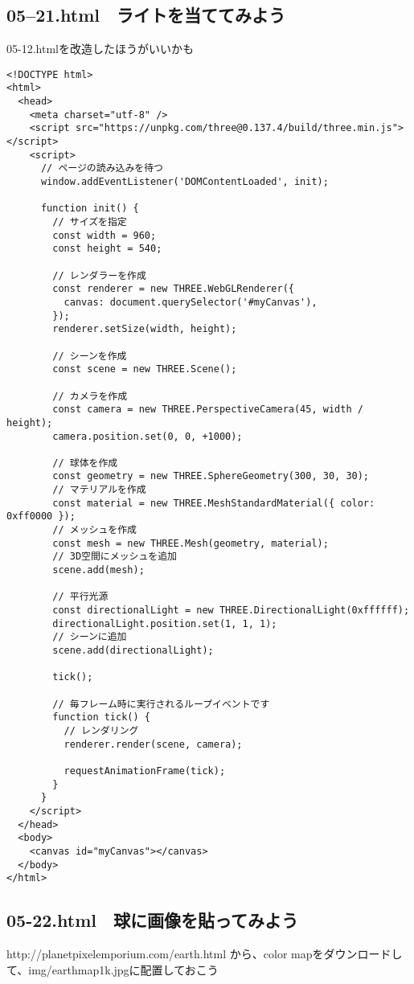 \documentclass[mingoth,11pt,a4j,uplatex]{jsarticle}
\begin{document}
\subsection{05--21.html　ライトを当ててみよう}
05-12.htmlを改造したほうがいいかも
\begin{lstlisting}[caption=05-21.html]
<!DOCTYPE html>
<html>
  <head>
    <meta charset="utf-8" />
    <script src="https://unpkg.com/three@0.137.4/build/three.min.js"></script>
    <script>
      // ページの読み込みを待つ
      window.addEventListener('DOMContentLoaded', init);

      function init() {
        // サイズを指定
        const width = 960;
        const height = 540;

        // レンダラーを作成
        const renderer = new THREE.WebGLRenderer({
          canvas: document.querySelector('#myCanvas'),
        });
        renderer.setSize(width, height);

        // シーンを作成
        const scene = new THREE.Scene();

        // カメラを作成
        const camera = new THREE.PerspectiveCamera(45, width / height);
        camera.position.set(0, 0, +1000);

        // 球体を作成
        const geometry = new THREE.SphereGeometry(300, 30, 30);
        // マテリアルを作成
        const material = new THREE.MeshStandardMaterial({ color: 0xff0000 });
        // メッシュを作成
        const mesh = new THREE.Mesh(geometry, material);
        // 3D空間にメッシュを追加
        scene.add(mesh);

        // 平行光源
        const directionalLight = new THREE.DirectionalLight(0xffffff);
        directionalLight.position.set(1, 1, 1);
        // シーンに追加
        scene.add(directionalLight);

        tick();

        // 毎フレーム時に実行されるループイベントです
        function tick() {
          // レンダリング
          renderer.render(scene, camera);

          requestAnimationFrame(tick);
        }
      }
    </script>
  </head>
  <body>
    <canvas id="myCanvas"></canvas>
  </body>
</html>
\end{lstlisting}

\subsection{05-22.html　球に画像を貼ってみよう}
http://planetpixelemporium.com/earth.html
から、color mapをダウンロードして、img/earthmap1k.jpgに配置しておこう
\end{document}
